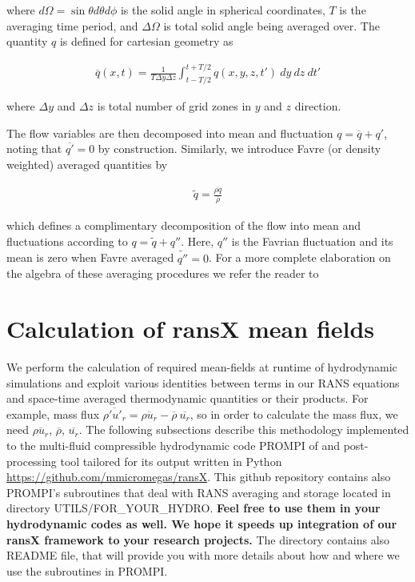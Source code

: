 \documentclass[11pt,paper=a4]{report}
\newcommand{\eht}{\overline}
\newcommand{\fht}{\widetilde}
\def\ff#1{#1''}
\begin{document}
\noindent where $d \Omega = \sin \theta d \theta d \phi$ is the solid angle in spherical coordinates, $T$ is the averaging time period, and $\Delta\Omega$ is total solid angle being averaged over. The quantity $q$ is defined for cartesian geometry as

\begin{align}\label{eq:eht}
\eht{q}(x,t) = \frac{1}{T \Delta y \Delta z}\int_{t- T/2}^{t+T/2} q(x,y,z,t')~dy~dz~dt'
\end{align}

\noindent where $\Delta y$ and $\Delta z$ is total number of grid zones in $y$ and $z$ direction.\\

\par The flow variables are then decomposed into mean and fluctuation $q = \eht{q} + q'$, noting that $\eht{q'} = 0$ by construction. Similarly, we introduce Favre (or density weighted) averaged quantities by 

\begin{align}
\fht{q} = \frac{\eht{\rho q}}{\eht{\rho}}
\end{align}

\noindent which defines a complimentary decomposition of the flow into mean and fluctuations according to $q = \fht{q} + \ff{q}$. Here, $\ff{q}$ is the Favrian fluctuation and its mean is zero when Favre averaged $\fht{\ff{q}} = 0$. For a more complete elaboration on the algebra of these averaging procedures we refer the reader to \citet{Chassaing2010}

\section{Calculation of ransX mean fields}

We perform the calculation of required mean-fields at runtime of hydrodynamic simulations and exploit various identities between terms in our RANS equations and space-time averaged thermodynamic quantities or their products. For example, mass flux $\eht{\rho'u'_r} = \eht{\rho u_r} - \eht{\rho} \ \eht{u_r} $, so in order to calculate the mass flux, we need $\eht{\rho u_r}$, $\eht{\rho}$, $\eht{u_r}$. The following subsections describe this methodology implemented to the multi-fluid compressible hydrodynamic code PROMPI of \citep{MeakinArnett2007} and post-processing tool tailored for its output written in Python \href{https://github.com/mmicromegas/ransX}{https://github.com/mmicromegas/ransX}. This github repository contains also PROMPI's subroutines that deal with RANS averaging and storage located in directory UTILS/FOR\_YOUR\_HYDRO. {\bf Feel free to use them in your hydrodynamic codes as well. We hope it speeds up integration of our ransX framework to your research projects.} The directory contains also README file, that will provide you with more details about how and where we use the subroutines in PROMPI.  
\end{document}

